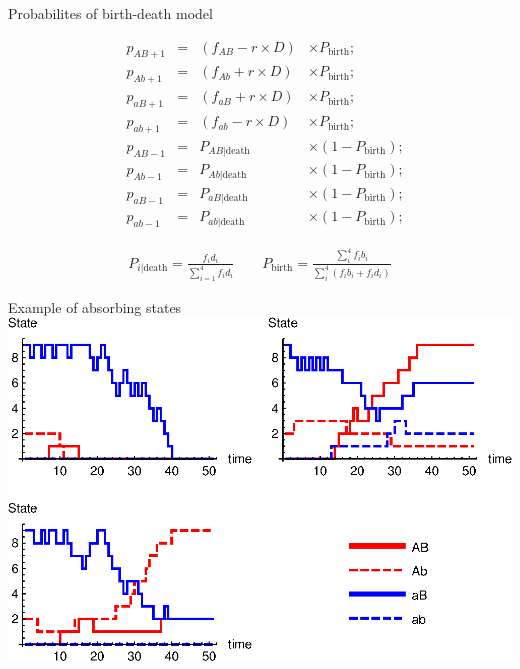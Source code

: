 \documentclass{beamer}
\begin{document}
\begin{frame}{Probabilites of birth-death model}

    \begin{equation*}
    \begin{aligned}
        &p_{AB+1} & =& (f_{AB}-r\times D) & \times P_\text{birth};\\
        &p_{Ab+1} & =& (f_{Ab}+r\times D) & \times P_\text{birth};\\
        &p_{aB+1} & =& (f_{aB}+r\times D) & \times P_\text{birth};\\
        &p_{ab+1} & =& (f_{ab}-r\times D) & \times P_\text{birth};\\
        &p_{AB-1} & =& P_{AB|\text{death}} & \times (1-P_\text{birth}); \\
        &p_{Ab-1} & =& P_{Ab|\text{death}} & \times (1-P_\text{birth}); \\
        &p_{aB-1} & =& P_{aB|\text{death}} & \times (1-P_\text{birth}); \\
        &p_{ab-1} & =& P_{ab|\text{death}} & \times (1-P_\text{birth}); 
    \end{aligned}
    \end{equation*} 
    
    \begin{equation*}
    \begin{aligned}
        P_{i|\text{death}}=\frac{f_id_i}{\sum_{i=1}^4 f_id_i} \qquad P_\text{birth} = \frac{\sum_i^4 f_i b_i}{\sum_i^4 (f_i b_i + f_i d_i)} 
    \end{aligned}
    \end{equation*}
  
    
\end{frame}

\begin{frame}{Example of absorbing states}
    \includegraphics[width=1.0\textwidth]{Matlab/data/gridplot.eps}
\end{frame}
\end{document}

